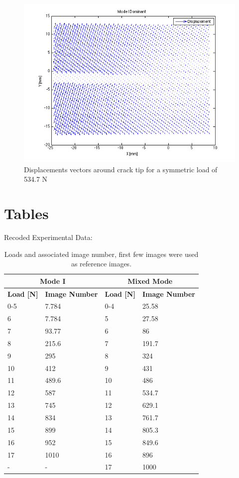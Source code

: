 \documentclass[12pt]{article}
\begin{document}
\begin{figure}[H]
	\centering
	\includegraphics[width=1\textwidth]{QuiverModeI.png}
	\caption{Displacements vectors around crack tip for a symmetric load of 534.7 N }
	\label{fig:Quiver1}
\end{figure}

	 
\section{Tables}
Recoded Experimental Data:
\begin{table}[h]\footnotesize
	\centering
	\begin{tabular}{ |l|l|l|l| }
		\hline
		\multicolumn{2}{|c|}{\textbf{Mode I}}&\multicolumn{2}{|c|}{\textbf{Mixed Mode}}\\ \hline
		\textbf{Load [N]} & \textbf{Image Number}&\textbf{Load [N]} & \textbf{Image Number}\\  \hline
		0-5 & 7.784 & 0-4 & 25.58 \\ \hline
		6& 7.784 & 5 & 27.58 \\ \hline
		7 & 93.77 & 6 & 86 \\ \hline
		8 & 215.6 & 7 &191.7 \\ \hline
		9 & 295 & 8 & 324 \\ \hline
		10 & 412 & 9 & 431 \\ \hline
		11 & 489.6 & 10 & 486 \\ \hline
		12 & 587 & 11 & 534.7 \\ \hline
		13 & 745 & 12 & 629.1 \\ \hline
		14 & 834 & 13 & 761.7 \\ \hline
		15 & 899 & 14 & 805.3 \\ \hline
		16 & 952 & 15 & 849.6 \\ \hline
		17 & 1010 & 16 & 896 \\ \hline
		-	& - & 17 & 1000 \\ \hline
		
		
		
	\end{tabular}
	\caption{Loads and associated image number, first few images were used as reference images.}
	\label{tab:data}
\end{table}
\
\end{document}
